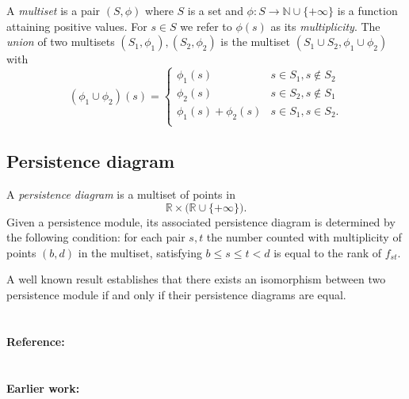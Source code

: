 \documentclass{amsart}
\begin{document}
	A \textit{multiset} is a pair $(S, \phi)$ where $S$ is a set and $\phi : S \to \mathbb N \cup \{+\infty\}$ is a function attaining positive values. For $s \in S$ we refer to $\phi(s)$ as its \textit{multiplicity}. The \textit{union} of two multisets $(S_1, \phi_1), (S_2, \phi_2)$ is the multiset $(S_1 \cup S_2, \phi_1 \cup \phi_2)$ with
	\begin{equation*}
	(\phi_1 \cup \phi_2)(s) = 
	\begin{cases}
	\phi_1(s) & s \in S_1, s \not\in S_2 \\
	\phi_2(s) & s \in S_2, s \not\in S_1 \\
	\phi_1(s) + \phi_2(s) & s \in S_1, s \in S_2. \\
	\end{cases}
	\end{equation*}
	
	\subsection*{Persistence diagram} \label{persistence_diagram}
	
	A \textit{persistence diagram} is a
	multiset of points in
	\begin{equation*}
	\mathbb R \times \big( \mathbb{R} \cup \{+\infty\} \big).
	\end{equation*}	
	Given a 
	persistence module, its associated persistence diagram is determined by the following condition: for each pair $s,t$ the number counted with multiplicity of points $(b,d)$ in the multiset, satisfying $b \leq s \leq t < d$ is equal to the rank of $f_{st}.$
	
	A well known result establishes that there exists an isomorphism between two persistence module if and only if their persistence diagrams are equal.
	
	\paragraph{\\ Reference:} \cite{zomorodian2005computing}
	\paragraph{\\ Earlier work:} \cite{morse1927rank, gabriel72decomposition, frosini1990shapes, barannikov1994morse, robins1999approximations, edelsbrunner2002simplification}
	
\end{document}
